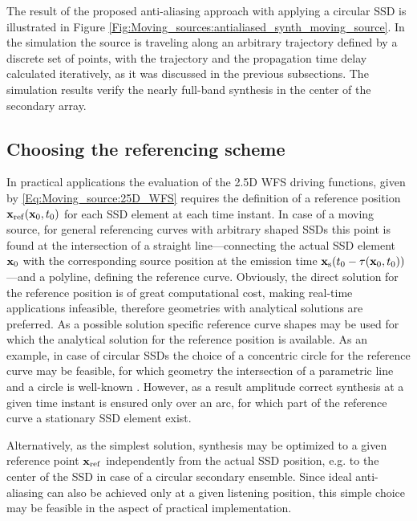 The result of the proposed anti-aliasing approach with applying a circular SSD is illustrated in Figure \ref{Fig:Moving_sources:antialiased_synth_moving_source}.
In the simulation the source is traveling along an arbitrary trajectory defined by a discrete set of points, with the trajectory and the propagation time delay calculated iteratively, as it was discussed in the previous subsections.
The simulation results verify the nearly full-band synthesis in the center of the secondary array.

\subsection{Choosing the referencing scheme}
In practical applications the evaluation of the 2.5D WFS driving functions, given by \eqref{Eq:Moving_source:25D_WFS} requires the definition of a reference position $\mathbf{x}_{\mathrm{ref}}(\mathbf{x}_0,t_0)$ for each SSD element at each time instant.
In case of a moving source, for general referencing curves with arbitrary shaped SSDs this point is found at the intersection of a straight line---connecting the actual SSD element $\mathbf{x}_0$ with the corresponding source position at the emission time $\mathbf{x}_{\mathrm{s}}(t_0-\tau(\mathbf{x}_0,t_0))$---and a polyline, defining the reference curve. 
Obviously, the direct solution for the reference position is of great computational cost, making real-time applications infeasible, therefore geometries with analytical solutions are preferred.
As a possible solution specific reference curve shapes may be used for which the analytical solution for the reference position is available.
As an example, in case of circular SSDs the choice of a concentric circle for the reference curve may be feasible, for which geometry the intersection of a parametric line and a circle is well-known \cite[Ch.7.3.2]{Schneider2003:ComputerGraphics}.
However, as a result amplitude correct synthesis at a given time instant is ensured only over an arc, for which part of the reference curve a stationary SSD element exist.

Alternatively, as the simplest solution, synthesis may be optimized to a given reference point $\mathbf{x}_{\mathrm{ref}}$ independently from the actual SSD position, e.g. to the center of the SSD in case of a circular secondary ensemble.
Since ideal anti-aliasing can also be achieved only at a given listening position, this simple choice may be feasible in the aspect of practical implementation.

